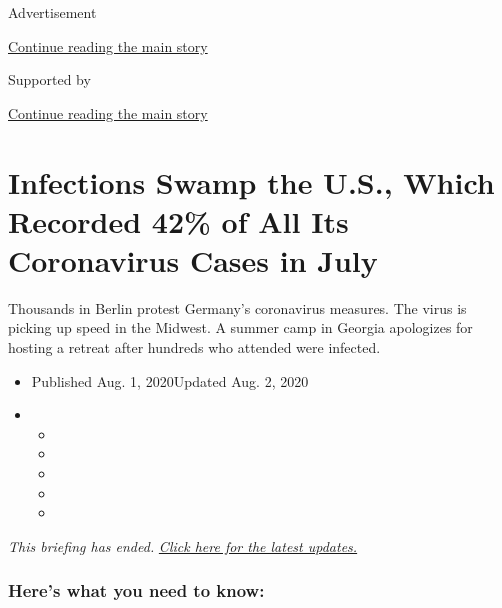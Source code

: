 Advertisement

\protect\hyperlink{after-top}{Continue reading the main story}

Supported by

\protect\hyperlink{after-sponsor}{Continue reading the main story}

\hypertarget{infections-swamp-the-us-which-recorded-42-of-all-its-coronavirus-cases-in-july}{%
\section{Infections Swamp the U.S., Which Recorded 42\% of All Its
Coronavirus Cases in
July}\label{infections-swamp-the-us-which-recorded-42-of-all-its-coronavirus-cases-in-july}}

Thousands in Berlin protest Germany's coronavirus measures. The virus is
picking up speed in the Midwest. A summer camp in Georgia apologizes for
hosting a retreat after hundreds who attended were infected.

\begin{itemize}
\item
  Published Aug. 1, 2020Updated Aug. 2, 2020
\item
  \begin{itemize}
  \item
  \item
  \item
  \item
  \item
  \end{itemize}
\end{itemize}

\emph{This briefing has ended.}
\href{https://www.nytimes.com/2020/08/02/world/coronavirus-updates.html}{\emph{Click
here for the latest updates.}}

\hypertarget{heres-what-you-need-to-know}{%
\subsubsection{Here's what you need to
know:}\label{heres-what-you-need-to-know}}

